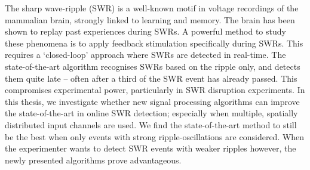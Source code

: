 The sharp wave-ripple (SWR) is a well-known motif in voltage recordings of the mammalian brain, strongly linked to learning and memory. The brain has been shown to replay past experiences during SWRs. A powerful method to study these phenomena is to apply feedback stimulation specifically during SWRs. This requires a `closed-loop' approach where SWRs are detected in real-time. The state-of-the-art algorithm recognises SWRs based on the ripple only, and detects them quite late -- often after a third of the SWR event has already passed. This compromises experimental power, particularly in SWR disruption experiments. In this thesis, we investigate whether new signal processing algorithms can improve the state-of-the-art in online SWR detection; especially when multiple, spatially distributed input channels are used. We find the state-of-the-art method to still be the best when only events with strong ripple-oscillations are considered. When the experimenter wants to detect SWR events with weaker ripples however, the newly presented algorithms prove advantageous.
